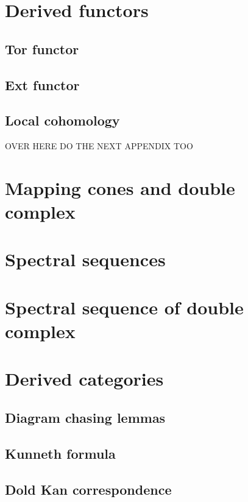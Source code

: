 \documentclass[12pt]{article}
\numberwithin{equation}{section}
\begin{document}
	\section{Derived functors}
	
	\subsection{Tor functor}
	\subsection{Ext functor}
	\subsection{Local cohomology}
	OVER HERE DO THE NEXT APPENDIX TOO
	
	\section{Mapping cones and double complex
	}
	
	\section{Spectral sequences}
	
	\section{Spectral sequence of double complex}
	
	\section{Derived categories}
		\subsection{Diagram chasing lemmas}
	\subsection{Kunneth formula}
	\subsection{Dold Kan correspondence	}
\end{document}
